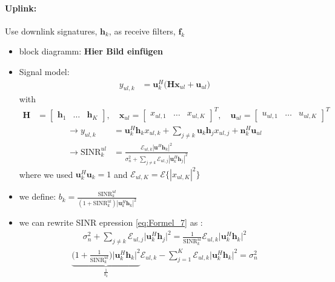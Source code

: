 \documentclass[a4paper, 10pt]{article}
\begin{document}
\paragraph{Uplink:} 
Use downlink signatures, $\mathbf{h}_k$, as receive filters, $\mathbf{f}_k$
\begin{itemize}
	\item block diagramm: \textbf{Hier Bild einf\"ugen}
	\item Signal model:
	\begin{align*}
		y_{ul,k} &= \mathbf{u}_k^H\bigl(\mathbf{Hx}_{ul} + \mathbf{u}_{ul}\bigr) 
	\end{align*}	
		with 
	\begin{align*}
		\mathbf{H} &= 
		\begin{bmatrix}
			\mathbf{h}_1 & \ldots & \mathbf{h}_K
		\end{bmatrix} ,\quad \mathbf{x}_{ul} = 
		\begin{bmatrix}
			x_{ul,1} & \ldots & x_{ul,K}
		\end{bmatrix}^T , \quad \mathbf{u}_{ul} = 
		\begin{bmatrix}
			u_{ul,1} & \ldots & u_{ul,K}
		\end{bmatrix}^T 
	\end{align*}		
	\begin{align}
		\rightarrow y_{ul,k} &= \mathbf{u}_k^H\mathbf{h}_kx_{ul,k} + \sum\limits_{j \neq k}\mathbf{u}_k\mathbf{h}_jx_{ul,j} + \mathbf{n}_k^H\mathbf{u}_{ul}\\
		\rightarrow \text{SINR}_k^{ul} &= \frac{\mathcal{E}_{ul,k}|\mathbf{u}^H\mathbf{h}_k|^2}{\sigma_n^2 + \sum\limits_{j\neq k}\mathcal{E}_{ul,j}|\mathbf{u}_k^H\mathbf{h}_j|^2}\label{eq:Formel_7}
	\end{align}
	where we used $\mathbf{u}_k^H\mathbf{u}_k = 1 $ and $ \mathcal{E}_{ul,K} = \mathcal{E}\bigl\{|x_{ul,K}|^2\bigr\} $ 
	\item we define: $ b_k = \frac{\text{SINR}_k^{ul}}{(1 + \text{SINR}_k^{ul})|\mathbf{u}_k^H\mathbf{h}_k|^2} $
	\item we can rewrite SINR epression \eqref{eq:Formel_7} as : 
	\begin{align*}
		\sigma_n^2 + \sum\limits_{j\neq k}\mathcal{E}_{ul,j}\bigl|\mathbf{u}_k^H\mathbf{h}_j\bigr|^2 = \frac{1}{\text{SINR}_k^{ul}} \mathcal{E}_{ul,k}\bigl|\mathbf{u}_k^H\mathbf{h}_k\bigr|^2
	\end{align*}
	\begin{align*}
		\underbrace{\bigl(1 + \frac{1}{\text{SINR}_k^{ul}}\bigr)\bigl|\mathbf{u}_k^H\mathbf{h}_k\bigr|^2}_{\frac{1}{b_k}}\mathcal{E}_{ul,k} - \sum\limits_{j = 1}^{K}\mathcal{E}_{ul,k}\bigl|\mathbf{u}_k^H\mathbf{h}_k\bigr|^2 = \sigma_n^2

\end{align*}
\end{itemize}
\end{document}
